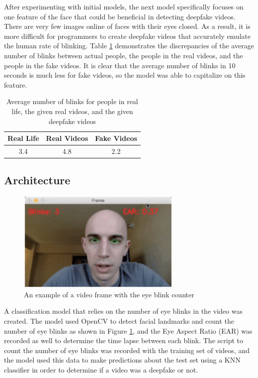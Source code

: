 \documentclass[a4paper]{article}
\begin{document}
After experimenting with initial models, the next model specifically focuses on one feature of the face that could be beneficial in detecting deepfake videos. There are very few images online of faces with their eyes closed. As a result, it is more difficult for programmers to create deepfake videos that accurately emulate the human rate of blinking. Table \ref{table:1} demonstrates the discrepancies of the average number of blinks between actual people, the people in the real videos, and the people in the fake videos. It is clear that the average number of blinks in 10 seconds is much less for fake videos, so the model was able to capitalize on this feature.

\begin{table}[ht]
\centering
\begin{tabular}{ |c|c|c| } 
\hline
Real Life & Real Videos & Fake Videos \\
\hline
 3.4 & 4.8 & 2.2 \\ 
 \hline
\end{tabular}
\caption{Average number of blinks for people in real life, the given real videos, and the given deepfake videos}
\label{table:1}
\end{table}

\subsection{Architecture}

\begin{figure}[ht]
\centering
\includegraphics[width=0.7\textwidth]{images/blink_frame.png}
\caption{An example of a video frame with the eye blink counter \cite{opencv}}
\label{fig:blink_frame}
\end{figure}

A classification model that relies on the number of eye blinks in the video was created. The model used OpenCV \cite{opencv} to detect facial landmarks and count the number of eye blinks as shown in Figure \ref{fig:blink_frame}, and the Eye Aspect Ratio (EAR) was recorded as well to determine the time lapse between each blink. The script to count the number of eye blinks was recorded with the training set of videos, and the model used this data to make predictions about the test set using a KNN classifier in order to determine if a video was a deepfake or not. 
\end{document}

